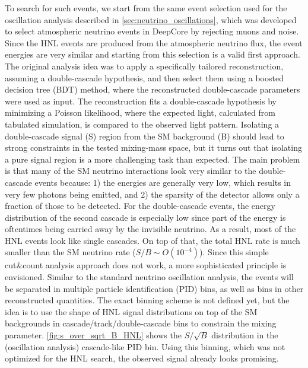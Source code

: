 \documentclass[a4paper,11pt]{article}
\begin{document}
To search for such events, we start from the same event selection used for the oscillation analysis described in \cref{sec:neutrino_oscillations}, which was developed to select atmospheric neutrino events in DeepCore by rejecting muons and noise. Since the HNL events are produced from the atmospheric neutrino flux, the event energies are very similar and starting from this selection is a valid first approach. The original analysis idea was to apply a specifically tailored reconstruction, assuming a double-cascade hypothesis, and then select them using a boosted decision tree (BDT) method, where the reconstructed double-cascade parameters were used as input. The reconstruction fits a double-cascade hypothesis by minimizing a Poisson likelihood, where the expected light, calculated from tabulated simulation, is compared to the observed light pattern. Isolating a double-cascade signal (S) region from the SM background (B) should lead to strong constraints in the tested mixing-mass space, but it turns out that isolating a pure signal region is a more challenging task than expected. The main problem is that many of the SM neutrino interactions look very similar to the double-cascade events because: 1) the energies are generally very low, which results in very few photons being emitted, and 2) the sparsity of the detector allows only a fraction of those to be detected. For the double-cascade events, the energy distribution of the second cascade is especially low since part of the energy is oftentimes being carried away by the invisible neutrino. As a result, most of the HNL events look like single cascades. On top of that, the total HNL rate is much smaller than the SM neutrino rate ($S/B\sim O(10^{-4})$). Since this simple cut\&count analysis approach does not work, a more sophisticated principle is envisioned. Similar to the standard neutrino oscillation analysis, the events will be separated in multiple particle identification (PID) bins, as well as bins in other reconstructed quantities. The exact binning scheme is not defined yet, but the idea is to use the shape of HNL signal distributions on top of the SM backgrounds in cascade/track/double-cascade bins to constrain the mixing parameter. \cref{fig:s_over_sqrt_B_HNL} shows the $S/\sqrt{B}$ distribution in the (oscillation analysis) cascade-like PID bin. Using this binning, which was not optimized for the HNL search, the observed signal already looks promising.
\end{document}
